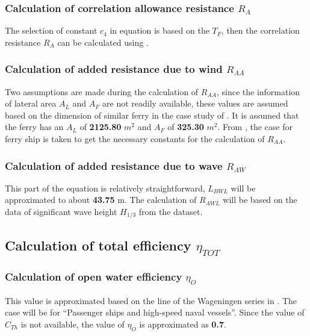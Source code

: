 \subsubsection*{Calculation of correlation allowance resistance $R_A$}

The selection of constant $c_4$ in equation  is based on the $T_F$, then the correlation resistance $R_A$ can be calculated using .

\subsubsection*{Calculation of added resistance due to wind $R_{AA}$}

Two assumptions are made during the calculation of $R_{AA}$, since the information of lateral area $A_L$ and $A_F$ are not readily available, these values are assumed based on the dimension of similar ferry in the case study of . It is assumed that the ferry has an $A_L$ of \textbf{2125.80} $m^2$ and $A_F$ of \textbf{325.30} $m^2$. From , the case for ferry ship is taken to get the necessary constants for the calculation of $R_{AA}$. 

\subsubsection*{Calculation of added resistance due to wave $R_{AW}$ }

This part of the equation is relatively straightforward, $L_{BWL}$ will be approximated to about \textbf{43.75} m. The calculation of $R_{AWL}$ will be based on the data of significant wave height $H_{1/3}$ from the dataset.

\pagebreak

\subsection{Calculation of total efficiency $\eta_{TOT}$}\label{sec:eta_tot_method}

\subsubsection*{Calculation of open water efficiency $\eta_O$}

This value is approximated based on the line of the Wageningen series in  . The case will be for ``Passenger ships and high-speed naval vessels''. Since the value of $C_{Th}$ is not available, the value of $\eta_O$ is approximated as \textbf{0.7}.

